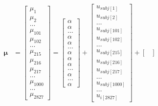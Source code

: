 \documentclass[12pt,]{krantz}
\theoremstyle{definition}
\theoremstyle{definition}
\theoremstyle{definition}
\theoremstyle{remark}
\begin{document}
\begin{equation}
 \begin{aligned}
    \boldsymbol{\mu} &=
    \begin{bmatrix}
        \mu_1 \\
        \mu_2 \\
        \ldots \\
        \mu_{101} \\
        \mu_{102} \\
        \ldots \\
        \mu_{215} \\
        \mu_{216} \\
        \mu_{217} \\
        \ldots \\
        \mu_{1000} \\
        \ldots \\
        \mu_{2827}
    \end{bmatrix}
=
    \begin{bmatrix}
        \alpha \\
        \alpha \\
        \ldots \\
        \alpha \\
        \alpha \\
        \ldots \\
        \alpha \\
        \alpha \\
        \alpha \\
        \ldots \\
        \alpha \\
        \ldots \\
        \alpha
    \end{bmatrix}
+
\begin{bmatrix}
u_{subj[1]} \\
u_{subj[2]} \\
\ldots \\
u_{subj[101]} \\
u_{subj[102]} \\
\ldots \\
u_{subj[215]} \\
u_{subj[216]} \\
u_{subj[217]} \\
\ldots \\
u_{subj[1000]} \\
\ldots \\
u_{i[2827]}
\end{bmatrix}
+
\begin{bmatrix}

\end{bmatrix}
\end{aligned}
\end{equation}
\end{document}
